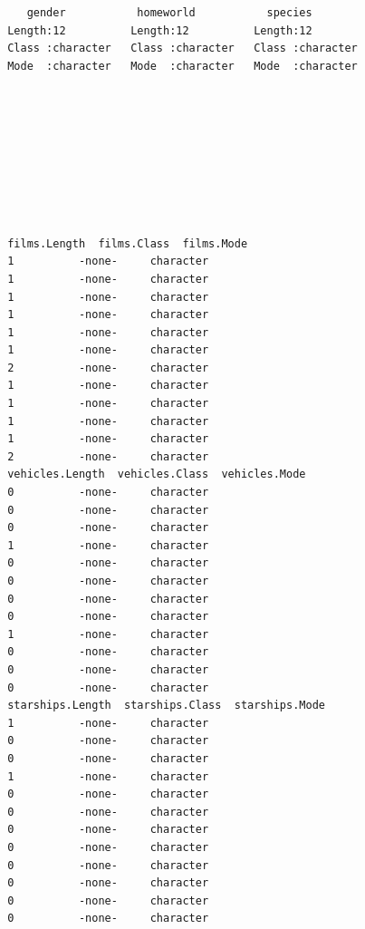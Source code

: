 \documentclass[
  a4paper,
]{scrbook}
\begin{document}
\begin{table}
{\begin{verbatim}
    gender           homeworld           species         
 Length:12          Length:12          Length:12         
 Class :character   Class :character   Class :character  
 Mode  :character   Mode  :character   Mode  :character  
                                                         
                                                         
                                                         
                                                         
                                                         
                                                         
                                                         
                                                         
                                                         
 films.Length  films.Class  films.Mode
 1          -none-     character      
 1          -none-     character      
 1          -none-     character      
 1          -none-     character      
 1          -none-     character      
 1          -none-     character      
 2          -none-     character      
 1          -none-     character      
 1          -none-     character      
 1          -none-     character      
 1          -none-     character      
 2          -none-     character      
 vehicles.Length  vehicles.Class  vehicles.Mode
 0          -none-     character               
 0          -none-     character               
 0          -none-     character               
 1          -none-     character               
 0          -none-     character               
 0          -none-     character               
 0          -none-     character               
 0          -none-     character               
 1          -none-     character               
 0          -none-     character               
 0          -none-     character               
 0          -none-     character               
 starships.Length  starships.Class  starships.Mode
 1          -none-     character                  
 0          -none-     character                  
 0          -none-     character                  
 1          -none-     character                  
 0          -none-     character                  
 0          -none-     character                  
 0          -none-     character                  
 0          -none-     character                  
 0          -none-     character                  
 0          -none-     character                  
 0          -none-     character                  
 0          -none-     character                  
\end{verbatim}

}

\end{table}%
\end{document}
